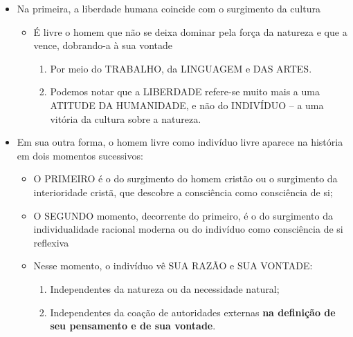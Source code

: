 \documentclass[
]{book}
\providecommand{\tightlist}{%
  \setlength{\itemsep}{0pt}\setlength{\parskip}{0pt}}
\begin{document}
\begin{itemize}
  \begin{itemize}
  \tightlist
  \item
    Na primeira, a liberdade humana coincide com o surgimento da cultura

    \begin{itemize}
    \tightlist
    \item
      É livre o homem que não se deixa dominar pela força da natureza e
      que a vence, dobrando-a à sua vontade

      \begin{enumerate}
      \def\labelenumi{\alph{enumi}.}
      \tightlist
      \item
        Por meio do TRABALHO, da LINGUAGEM e DAS ARTES.
      \item
        Podemos notar que a LIBERDADE refere-se muito mais a uma ATITUDE
        DA HUMANIDADE, e não do INDIVÍDUO -- a uma vitória da cultura
        sobre a natureza.
      \end{enumerate}
    \end{itemize}
  \item
    Em sua outra forma, o homem livre como indivíduo livre aparece na
    história em dois momentos sucessivos:

    \begin{itemize}
    \tightlist
    \item
      O PRIMEIRO é o do surgimento do homem cristão ou o surgimento da
      interioridade cristã, que descobre a consciência como consciência
      de si;
    \item
      O SEGUNDO momento, decorrente do primeiro, é o do surgimento da
      individualidade racional moderna ou do indivíduo como consciência
      de si reflexiva
    \item
      Nesse momento, o indivíduo vê SUA RAZÃO e SUA VONTADE:

      \begin{enumerate}
      \def\labelenumi{\alph{enumi}.}
      \tightlist
      \item
        Independentes da natureza ou da necessidade natural;
      \item
        Independentes da coação de autoridades externas \textbf{na
        definição de seu pensamento e de sua vontade}.
      \end{enumerate}
    \end{itemize}
  \end{itemize}
\end{itemize}
\end{document}
